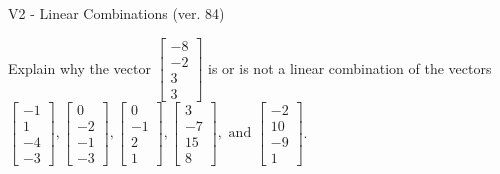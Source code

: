 \begin{exercise}
  \begin{exerciseTitle}V2 - Linear Combinations (ver. 84)\end{exerciseTitle}
  \begin{exerciseStatement}
    Explain why the vector \(\left[\begin{array}{c}
-8 \\
-2 \\
3 \\
3
\end{array}\right]\)  is or is not a linear 
	combination of the vectors \(\left[\begin{array}{c}
-1 \\
1 \\
-4 \\
-3
\end{array}\right] , \left[\begin{array}{c}
0 \\
-2 \\
-1 \\
-3
\end{array}\right] , \left[\begin{array}{c}
0 \\
-1 \\
2 \\
1
\end{array}\right] , \left[\begin{array}{c}
3 \\
-7 \\
15 \\
8
\end{array}\right] , \text{ and } \left[\begin{array}{c}
-2 \\
10 \\
-9 \\
1
\end{array}\right]\).
	



\end{exerciseStatement}
\end{exercise}

